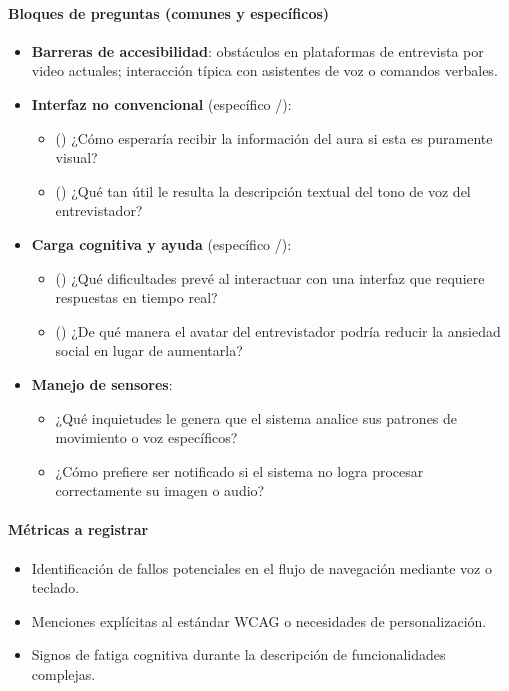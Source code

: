 \paragraph{Bloques de preguntas (comunes y específicos)}
\begin{itemize}
  \item \textbf{Barreras de accesibilidad}: obstáculos en plataformas
        de entrevista por video actuales; interacción típica con
        asistentes de voz o comandos verbales.
  \item \textbf{Interfaz no convencional} (específico /):
        \begin{itemize}
          \item () ¿Cómo esperaría recibir la información del
                aura si esta es puramente visual?
          \item () ¿Qué tan útil le resulta la descripción
                textual del tono de voz del entrevistador?
        \end{itemize}
  \item \textbf{Carga cognitiva y ayuda} (específico /):
        \begin{itemize}
          \item () ¿Qué dificultades prevé al interactuar con
                una interfaz que requiere respuestas en tiempo real?
          \item () ¿De qué manera el avatar del entrevistador
                podría reducir la ansiedad social en lugar de
                aumentarla?
        \end{itemize}
  \item \textbf{Manejo de sensores}:
        \begin{itemize}
          \item ¿Qué inquietudes le genera que el sistema analice sus
                patrones de movimiento o voz específicos?
          \item ¿Cómo prefiere ser notificado si el sistema no logra
                procesar correctamente su imagen o audio?
        \end{itemize}
\end{itemize}

\paragraph{Métricas a registrar}
\begin{itemize}
  \item Identificación de fallos potenciales en el flujo de navegación
        mediante voz o teclado.
  \item Menciones explícitas al estándar WCAG o necesidades de
        personalización.
  \item Signos de fatiga cognitiva durante la descripción de
        funcionalidades complejas.
\end{itemize}


